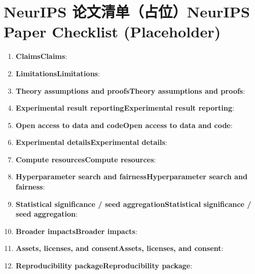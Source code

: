 \section*{\ifinternalcn NeurIPS 论文清单（占位）\else NeurIPS Paper Checklist (Placeholder)\fi}

\begin{enumerate}[leftmargin=1.5em]
  \item \textbf{\ifinternalcn Claims\else Claims\fi}: \answerTODO{}
  \item \textbf{\ifinternalcn Limitations\else Limitations\fi}: \answerTODO{}
  \item \textbf{\ifinternalcn Theory assumptions and proofs\else Theory assumptions and proofs\fi}: \answerTODO{}
  \item \textbf{\ifinternalcn Experimental result reporting\else Experimental result reporting\fi}: \answerTODO{}
  \item \textbf{\ifinternalcn Open access to data and code\else Open access to data and code\fi}: \answerTODO{}
  \item \textbf{\ifinternalcn Experimental details\else Experimental details\fi}: \answerTODO{}
  \item \textbf{\ifinternalcn Compute resources\else Compute resources\fi}: \answerTODO{}
  \item \textbf{\ifinternalcn Hyperparameter search and fairness\else Hyperparameter search and fairness\fi}: \answerTODO{}
  \item \textbf{\ifinternalcn Statistical significance / seed aggregation\else Statistical significance / seed aggregation\fi}: \answerTODO{}
  \item \textbf{\ifinternalcn Broader impacts\else Broader impacts\fi}: \answerTODO{}
  \item \textbf{\ifinternalcn Assets, licenses, and consent\else Assets, licenses, and consent\fi}: \answerTODO{}
  \item \textbf{\ifinternalcn Reproducibility package\else Reproducibility package\fi}: \answerTODO{}
\end{enumerate}
